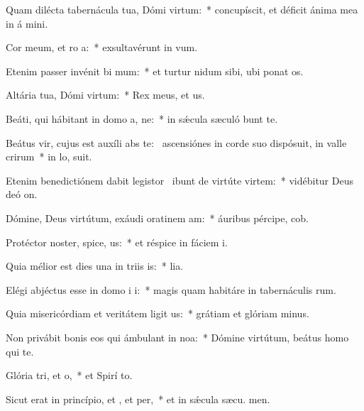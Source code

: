 \item Quam dilécta tabernácula tua, Dómi virtum:~* concupíscit, et déficit ánima mea in á mini.
\item Cor meum, et ro a:~* exsultavérunt in  vum.
\item Etenim passer invénit bi mum:~* et turtur nidum sibi, ubi ponat  os.
\item Altária tua, Dómi virtum:~* Rex meus, et  us.
\item Beáti, qui hábitant in domo a, ne:~* in sǽcula sæculó bunt te.
\item Beátus vir, cujus est auxíli abs te:~\pscross{} ascensiónes in corde suo dispósuit, in valle crirum~* in lo,  suit.
\item Etenim benedictiónem dabit legistor~\pscross{} ibunt de virtúte  virtem:~* vidébitur Deus deó  on.
\item Dómine, Deus virtútum, exáudi oratinem am:~* áuribus pércipe,  cob.
\item Protéctor noster, spice, us:~* et réspice in fáciem  i.
\item Quia mélior est dies una in triis is:~*  lia.
\item Elégi abjéctus esse in domo i i:~* magis quam habitáre in tabernáculis rum.
\item Quia misericórdiam et veritátem ligit us:~* grátiam et glóriam  minus.
\item Non privábit bonis eos qui ámbulant in noa:~* Dómine virtútum, beátus homo qui   te.
\item Glória tri, et o,~* et Spirí to.
\item Sicut erat in princípio, et , et per,~* et in sǽcula sæcu. men.
